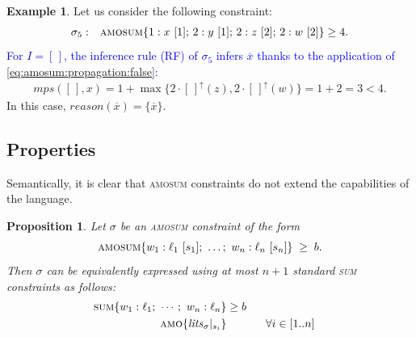 \documentclass[preprint,authoryear]{elsarticle}
\newcommand{\mps}{\mathit{mps}}
\newtheorem{proposition}{Proposition}[section]
\theoremstyle{definition}
\newtheorem{example}{Example}[section]
\def\amosum{\ensuremath{\textsc{amosum}}\xspace}
\begin{document}
\begin{example}\label{ex:amosum:propagation:3}
Let us consider the following constraint:
\begin{align*}
\begin{array}{rl}
    \sigma_{5}: & \amosum\{
        1 : x\ [1];\, 2 : y\ [1];\, 2 : z\ [2];\, 2 : w\ [2]
    \} \geq 4.
\end{array}
\end{align*}
\textcolor{blue}{For $I = [\,]$, the inference rule (RF) of $\sigma_5$ infers $\overline{x}$ thanks to the application of \eqref{eq:amosum:propagation:false}:}
\begin{align*}
    \mps([\,], x) =  1 + \max\{2 \cdot [\,]^\uparrow(z), 2 \cdot [\,]^\uparrow(w)\} = 1 + 2 = 3 < 4.
\end{align*}
In this case, $\mathit{reason}(\overline{x}) = \{\overline{x}\}$.
\end{example}

\subsection{Properties}\label{sec:amo:properties}

Semantically, it is clear that \textsc{amosum} constraints do not extend the capabilities of the language.

\begin{proposition}
Let $\sigma$ be an \textsc{amosum} constraint of the form
\begin{equation}
\label{eq:amosum:prop}
    \textsc{amosum}\{w_1 : \ell_1\ [s_1];\ \dots;\ w_n : \ell_n\ [s_n]\} \;\geq\; b.
\end{equation}
Then $\sigma$ can be equivalently expressed using at most $n+1$ standard 
\textsc{sum}  constraints as follows:
\begin{align*}
    \textsc{sum}\{w_1 : \ell_1;\ \cdots;\ w_n : \ell_n\} \geq b\\
    \textsc{amo}\{\mathit{lits}_\sigma|_{s_i}\}\phantom{{}\geq b} & \phantom{xxx} \forall i \in [1..n]
\end{align*}

\end{proposition}
\end{document}
